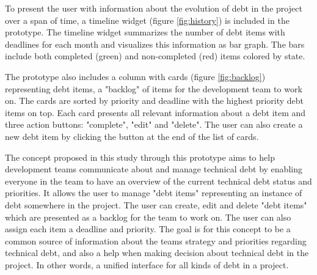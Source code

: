 

To present the user with information about the evolution of debt in the project over a span of time, a timeline widget (figure \ref{fig:history}) is included in the prototype.
The timeline widget summarizes the number of debt items with deadlines for each month and visualizes this information as bar graph.
The bars include both completed (green) and non-completed (red) items colored by state.



The prototype also includes a column with cards (figure \ref{fig:backlog}) representing debt items, a "backlog" of items for the development team to work on.
The cards are sorted by priority and deadline with the highest priority debt items on top.
Each card presents all relevant information about a debt item and three action buttons: "complete", "edit" and "delete".
The user can also create a new debt item by clicking the button at the end of the list of cards.

The concept proposed in this study through this prototype aims to help development teams communicate about and manage technical debt by enabling everyone in the team to have an overview of the current technical debt status and priorities.
It allows the user to manage "debt items" representing an instance of debt somewhere in the project.
The user can create, edit and delete "debt items" which are presented as a backlog for the team to work on.
The user can also assign each item a deadline and priority. 
The goal is for this concept to be a common source of information about the teams strategy and priorities regarding technical debt, and also a help when making decision about technical debt in the project.
In other words, a unified interface for all kinds of debt in a project.